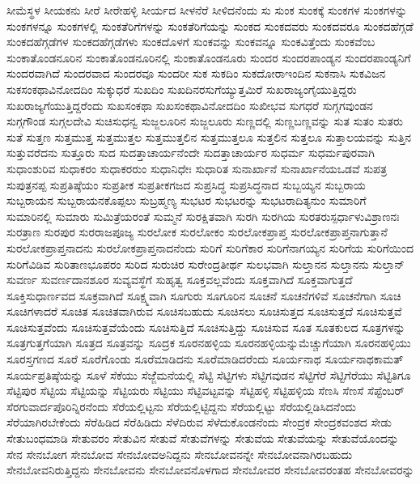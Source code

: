 {ಸೀಮೆಸ್ಥಳ
ಸೀಯಕನು
ಸೀರೆ
ಸೀರೇಹಳ್ಳಿ
ಸೀರ್ಯದ
ಸೀಳನೆರೆ
ಸೀಳಿದನೆಂದು
ಸು
ಸುಂಕ
ಸುಂಕಕ್ಕೆ
ಸುಂಕಗಳ
ಸುಂಕಗಳನ್ನು
ಸುಂಕಗಳನ್ನೂ
ಸುಂಕಗಳಲ್ಲಿ
ಸುಂಕತೆರಿಗೆಗಳನ್ನು
ಸುಂಕತೆರಿಗೆಯನ್ನು
ಸುಂಕದ
ಸುಂಕದವರು
ಸುಂಕದವರೂ
ಸುಂಕದಹೆಗ್ಗಡೆ
ಸುಂಕದಹೆಗ್ಗಡೆಗಳ
ಸುಂಕದಹೆಗ್ಗಡೆಗಳು
ಸುಂಕದೊಳಗೆ
ಸುಂಕವನ್ನು
ಸುಂಕವನ್ನೂ
ಸುಂಕವಿತ್ತೆಂದು
ಸುಂಕವೆಂಬ
ಸುಂಕಾತೊಂಡನೂರಿನ
ಸುಂಕಾತೊಂಡನೂರಿನಲ್ಲಿ
ಸುಂಕಾತೊಂಡನೂರು
ಸುಂದರ
ಸುಂದರಪಾಂಡ್ಯನ
ಸುಂದರಪಾಂಡ್ಯನಿಗೆ
ಸುಂದರವಾಗಿದೆ
ಸುಂದರವಾದ
ಸುಂದರವೂ
ಸುಂದರೀ
ಸುಕ
ಸುಕದಿಂ
ಸುಕದೋರಾಇಂದಿನ
ಸುಕನಾಸಿ
ಸುಕವಿಜನ
ಸುಕಸಂಕಥಾವಿನೋದದಿಂ
ಸುಕ್ಕುಧರೆ
ಸುಖದಿಂ
ಸುಖದಿನರಸುಗೆಯ್ಯುತ್ತಮಿರೆ
ಸುಖರಾಜ್ಯಂಗೈಯುತ್ತಿದ್ದರು
ಸುಖರಾಜ್ಯಗೆಯುತ್ತಿದ್ದರೆಂದು
ಸುಖಸಂಕಥಾ
ಸುಖಸಂಕಥಾವಿನೋದದಿಂ
ಸುಖೀಭವ
ಸುಗಧರೆ
ಸುಗ್ಗಗವುಂಡನ
ಸುಗ್ಗಗೌಂಡ
ಸುಗ್ಗಲದೇವಿ
ಸುಚಿಸುಧನ್ವ
ಸುಜ್ಜಲೂರಿನ
ಸುಜ್ಜಲೂರು
ಸುಣ್ಣದಲ್ಲಿ
ಸುಣ್ಣಬಣ್ಣವನ್ನು
ಸುತ
ಸುತಂ
ಸುತರು
ಸುತೆ
ಸುತ್ತಣ
ಸುತ್ತಮುತ್ತ
ಸುತ್ತಮುತ್ತಲ
ಸುತ್ತಮುತ್ತಲಿನ
ಸುತ್ತಮುತ್ತಲೂ
ಸುತ್ತಲಿನ
ಸುತ್ತಲೂ
ಸುತ್ತಾಲಯವನ್ನು
ಸುತ್ತಿನ
ಸುತ್ತುವರೆದನು
ಸುತ್ತೂರು
ಸುದ
ಸುದತ್ತಾಚಾರ್ಯನೆಂದೇ
ಸುದತ್ತಾಚಾರ್ಯರ
ಸುಧರ್ಮ
ಸುಧರ್ಮಪುರವಾಗಿ
ಸುಧಾಂಶುರಿವ
ಸುಧಾಕರಂ
ಸುಧಾಕರರುಂ
ಸುಧಾನಿಧೇಃ
ಸುಧಾರಿತ
ಸುನಾರ್ಖಾನೆ
ಸುನಾರ್ಖಾನೆಯಒಡವೆ
ಸುಪತ್ರ
ಸುಪುತ್ರನಪ್ಪ
ಸುಪ್ರತಿಷ್ಠೆಯಂ
ಸುಪ್ರತೀಕ
ಸುಪ್ರತೀಕಗಜದ
ಸುಪ್ರಸಿದ್ಧ
ಸುಪ್ರಸಿದ್ಧನಾದ
ಸುಬ್ಬಯ್ಯನ
ಸುಬ್ಬರಾಯ
ಸುಬ್ಬರಾಯನ
ಸುಬ್ಬರಾಯನಕೊಪ್ಪಲು
ಸುಬ್ರಹ್ಮಣ್ಯ
ಸುಭಟರ
ಸುಭಟರನ್ನು
ಸುಭಟರಾದಿತ್ಯನುಂ
ಸುಮಾರಿಗೆ
ಸುಮಾರಿನಲ್ಲಿ
ಸುಮಾರು
ಸುಮಿತ್ರೆಯರಂತೆ
ಸುಮ್ಮನೆ
ಸುರಕ್ಷಿತವಾಗಿ
ಸುರಗಿ
ಸುರಗಿಯ
ಸುರತರುಸ್ಪರ್ಧಾಳುವಿಶ್ರಾಣನಃ
ಸುರತ್ರಾಣ
ಸುರಪುರ
ಸುರರಾಜಪೂಜ್ಯ
ಸುರಲೋಕ
ಸುರಲೋಕಂ
ಸುರಲೋಕಪ್ರಾಪ್ತ
ಸುರಲೋಕಪ್ರಾಪ್ತನಾಗುತ್ತಾನೆ
ಸುರಲೋಕಪ್ರಾಪ್ತನಾದನು
ಸುರಲೋಕಪ್ರಾಪ್ತನಾದನೆಂದು
ಸುರಿಗೆ
ಸುರಿಗೆಕಾರ
ಸುರಿಗೆನಾಗಯ್ಯನ
ಸುರಿಗೆಯ
ಸುರಿಗೆಯಿಂದ
ಸುರಿಗೆವಿಡಿವ
ಸುರಿತಾಣಭೂಪರಂ
ಸುರಿದ
ಸುರುಚಿರ
ಸುರೇಂದ್ರತೀರ್ಥ
ಸುಲಭವಾಗಿ
ಸುಲ್ತಾನನ
ಸುಲ್ತಾನನು
ಸುಲ್ತಾನ್
ಸುವರ್ಣ
ಸುವರ್ಣದಾನಶೂರ
ಸುವ್ಯವಸ್ಥೆಗೆ
ಸುಹೃತ್ವ
ಸೂಕ್ತವಲ್ಲವೆಂದು
ಸೂಕ್ತವಾಗಿದೆ
ಸೂಕ್ತವಾಗುತ್ತದೆ
ಸೂಕ್ತಿಸುಧಾರ್ಣವದ
ಸೂಕ್ರವಾಗಿದೆ
ಸೂಕ್ಷ್ಮವಾಗಿ
ಸೂಗುರು
ಸೂಗೂರಿನ
ಸೂಚನೆ
ಸೂಚನೆಗಳಿವೆ
ಸೂಚನೆಗಾಗಿ
ಸೂಚಿ
ಸೂಚಿಗಳಾದರೆ
ಸೂಚಿತ
ಸೂಚಿತವಾಗಿರುವ
ಸೂಚಿಸಬಹುದು
ಸೂಚಿಸಲು
ಸೂಚಿಸುತ್ತದ
ಸೂಚಿಸುತ್ತದೆ
ಸೂಚಿಸುತ್ತವೆ
ಸೂಚಿಸುತ್ತವೆಂದು
ಸೂಚಿಸುತ್ತವೆಯೆಂದು
ಸೂಚಿಸುತ್ತಿದೆ
ಸೂಚಿಸುತ್ತಿದ್ದು
ಸೂಚಿಸುವ
ಸೂತ
ಸೂತಕುಲದ
ಸೂತ್ರಗಳನ್ನು
ಸೂತ್ರಗುತ್ತಗೆಯಾಗಿ
ಸೂತ್ರದ
ಸೂತ್ರವನ್ನು
ಸೂದ್ರಕ
ಸೂರನಹಳ್ಳಿಯ
ಸೂರನಹಳ್ಳಿಯನ್ನುಮೆಚ್ಚುಗೆಯಾಗಿ
ಸೂರನಹಳ್ಳಿಯು
ಸೂರಸ್ತಗಣದ
ಸೂರೆ
ಸೂರೆಗೊಂಡು
ಸೂರೆಮಾಡಿದನು
ಸೂರೆಮಾಡಿದರೆಂದು
ಸೂರ್ಯನಾಥ
ಸೂರ್ಯನಾಥಕಾಮತ್
ಸೂರ್ಯಪ್ರತಿಷ್ಠೆಯನ್ನು
ಸೂಳೆ
ಸೆಕೆಯು
ಸೆಜ್ಜೆೆಮನೆಯಲ್ಲಿ
ಸೆಟ್ಟಿ
ಸೆಟ್ಟಿಗಳು
ಸೆಟ್ಟಿಗವುಡನ
ಸೆಟ್ಟಿಗೆರೆ
ಸೆಟ್ಟಿಗೆರೆಯು
ಸೆಟ್ಟಿತಿಗೂ
ಸೆಟ್ಟಿಪುರ
ಸೆಟ್ಟಿಯ
ಸೆಟ್ಟಿಯನ್ನು
ಸೆಟ್ಟಿಯರು
ಸೆಟ್ಟಿಯು
ಸೆಟ್ಟಿವಟ್ಟವನ್ನು
ಸೆಟ್ಟಿಹಳ್ಳಿ
ಸೆಟ್ಟಿಹಳ್ಳಿಯ
ಸೆಣಸಿ
ಸೆಣಸೆ
ಸೆಪ್ಟೆಂಬರ್
ಸೆರಗುವಾರ್ದಪೊರಿನ್ನಿರನೆಂದು
ಸೆರೆಯಲ್ಲಿಟ್ಟನು
ಸೆರೆಯಲ್ಲಿಟ್ಟಿದ್ದನು
ಸೆರೆಯಲ್ಲಿಟ್ಟು
ಸೆರೆಯಲ್ಲಿಡಿಸಿದನೆಂದು
ಸೆರೆಯಾಗಿರಬೇಕೆಂದು
ಸೆರೆಹಿಡಿದ
ಸೆರೆಹಿಡಿದು
ಸೆಳೆದಿರುವ
ಸೆಳೆದುಕೊಂಡನೆಂದು
ಸೇಂದ್ರಕ
ಸೇಂದ್ರಕವಂಶದ
ಸೇಡು
ಸೇತುಬಂಧಮಾಡಿ
ಸೇತುವರಂ
ಸೇತುವಿನ
ಸೇತುವೆ
ಸೇತುವೆಗಳನ್ನು
ಸೇತುವೆಯ
ಸೇತುವೆಯನ್ನು
ಸೇತುವೆಯೊಂದನ್ನು
ಸೇನ
ಸೇನಬೋಗ
ಸೇನಬೋವ
ಸೇನಬೋವಅನಿದ್ದನು
ಸೇನಬೋವನನ್ನೇ
ಸೇನಬೋವನಾಗಿರಬಹುದು
ಸೇನಬೋವನಿರುತ್ತಿದ್ದನು
ಸೇನಬೋವನು
ಸೇನಬೋವನೊಳಗಾದ
ಸೇನಬೋವರ
ಸೇನಬೋವರಂತಹ
ಸೇನಬೋವರನ್ನು
}
